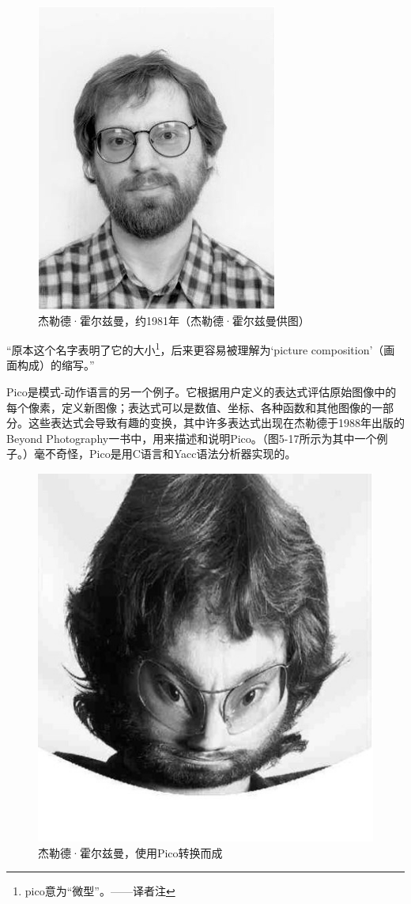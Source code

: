 \documentclass[a4paper,12pt,UTF8,twoside]{ctexbook}
\begin{document}
\begin{figure}[htbp]
	\centering
	\includegraphics[width=0.7\linewidth]{55}
	\caption{杰勒德·霍尔兹曼，约1981年（杰勒德·霍尔兹曼供图）}
	\label{fig:1}
\end{figure}

“原本这个名字表明了它的大小\footnote{pico意为“微型”。——译者注}，后来更容易被理解为‘picture composition’（画面构成）的缩写。”

Pico是模式-动作语言的另一个例子。它根据用户定义的表达式评估原始图像中的每个像素，定义新图像；表达式可以是数值、坐标、各种函数和其他图像的一部分。这些表达式会导致有趣的变换，其中许多表达式出现在杰勒德于1988年出版的Beyond Photography一书中，用来描述和说明Pico。（图5-17所示为其中一个例子。）毫不奇怪，Pico是用C语言和Yacc语法分析器实现的。

\begin{figure}[htbp]
	\centering
	\includegraphics[width=0.7\linewidth]{56}
	\caption{杰勒德·霍尔兹曼，使用Pico转换而成}
	\label{fig:1}
\end{figure}
\end{document}
